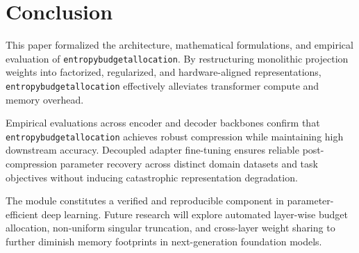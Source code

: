 \section{Conclusion}
This paper formalized the architecture, mathematical formulations, and empirical evaluation of \texttt{entropybudgetallocation}. By restructuring monolithic projection weights into factorized, regularized, and hardware-aligned representations, \texttt{entropybudgetallocation} effectively alleviates transformer compute and memory overhead.

Empirical evaluations across encoder and decoder backbones confirm that \texttt{entropybudgetallocation} achieves robust compression while maintaining high downstream accuracy. Decoupled adapter fine-tuning ensures reliable post-compression parameter recovery across distinct domain datasets and task objectives without inducing catastrophic representation degradation.

The module constitutes a verified and reproducible component in parameter-efficient deep learning. Future research will explore automated layer-wise budget allocation, non-uniform singular truncation, and cross-layer weight sharing to further diminish memory footprints in next-generation foundation models.
